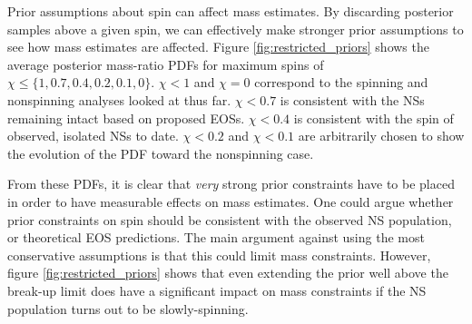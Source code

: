 Prior assumptions about spin can affect mass estimates.  By discarding posterior samples above a given spin, we can effectively make stronger prior assumptions to see how mass estimates are affected.  Figure \ref{fig:restricted_priors} shows the average posterior mass-ratio PDFs for maximum spins of $\chi \leq \{1, 0.7, 0.4, 0.2, 0.1, 0\}$.  $\chi<1$ and $\chi=0$ correspond to the spinning and nonspinning analyses looked at thus far.  $\chi<0.7$ is consistent with the NSs remaining intact based on proposed EOSs.  $\chi<0.4$ is consistent with the spin of observed, isolated NSs to date.  $\chi<0.2$ and $\chi<0.1$ are arbitrarily chosen to show the evolution of the PDF toward the nonspinning case.

From these PDFs, it is clear that \emph{very} strong prior constraints have to be placed in order to have measurable effects on mass estimates. One could argue whether prior constraints on spin should be consistent with the observed NS population, or theoretical EOS predictions.  The main argument against using the most conservative assumptions is that this could limit mass constraints.  However, figure \ref{fig:restricted_priors} shows that even extending the prior well above the break-up limit does have a significant impact on mass constraints if the NS population turns out to be slowly-spinning.